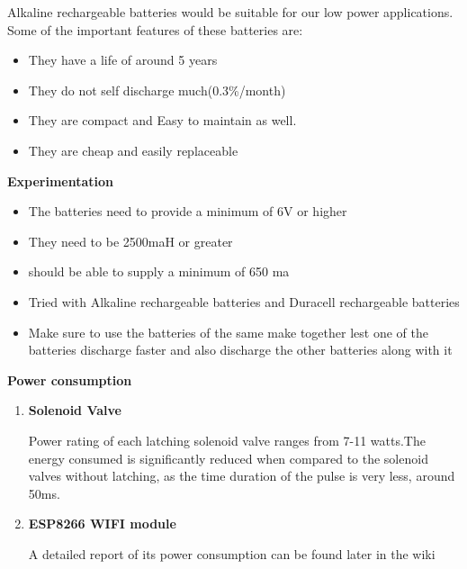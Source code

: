 \documentclass[16pt]{article}
\begin{document}
\hfill


Alkaline rechargeable batteries would be suitable for our low power
applications. Some of the important features of these batteries are:
\hfill
\begin{itemize}

\item
  They have a life of around 5 years
\item
  They do not self discharge much(0.3\%/month)
\item
  They are compact and Easy to maintain as well.
\item
  They are cheap and easily replaceable
\end{itemize}

\hfill

{\Large{\textbf{Experimentation}}}

\begin{itemize}

\item
  The batteries need to provide a minimum of 6V or higher
\item
  They need to be 2500maH or greater
\item
  should be able to supply a minimum of 650 ma
\item
  Tried with Alkaline rechargeable batteries and Duracell rechargeable
  batteries
\item
  Make sure to use the batteries of the same make together lest one of
  the batteries discharge faster and also discharge the other batteries
  along with it
\end{itemize}

\hfill

{\Large{\textbf{Power consumption}}}

\begin{enumerate}

 
\item\textbf{Solenoid Valve}

Power rating of each latching solenoid valve
ranges from 7-11 watts.The energy consumed is significantly reduced when
compared to the solenoid valves without latching, as the time duration
of the pulse is very less, around 50ms.

\item\textbf{ESP8266 WIFI module}

A detailed report of its power consumption can be found later in the
wiki

\end{enumerate}
\end{document}
